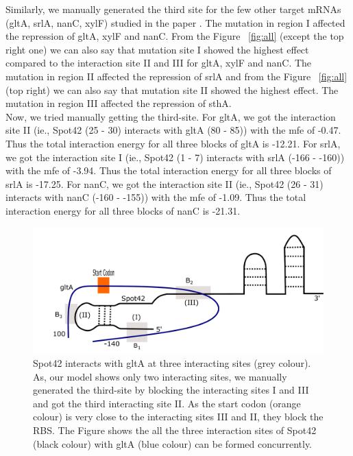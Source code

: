 \documentclass[twoside,a4paper]{report}
\numberwithin{equation}{section}
\begin{document}
Similarly, we manually generated the third site for the few other target mRNAs (gltA, srlA, nanC, xylF) studied in the paper \citep{beisel2011base}. The mutation in region I affected the repression of gltA, xylF and nanC. From the Figure ~\ref{fig:all} (except the top right one) we can also say that mutation site I showed the highest effect compared to the interaction site II and III for gltA, xylF and nanC. The mutation in region II affected the repression of srlA and from the Figure ~\ref{fig:all} (top right) we can also say that mutation site II showed the highest effect. The mutation in region III affected the repression of sthA. \\

 Now, we tried manually getting the third-site. For gltA, we got the interaction site II (ie., Spot42 (25 - 30) interacts with gltA (80 - 85)) with the mfe of -0.47. Thus the total interaction energy for all three blocks of gltA is -12.21.  For srlA, we got the interaction site I (ie., Spot42 (1 - 7) interacts with srlA (-166 - -160)) with the mfe of -3.94. Thus the total interaction energy for all three blocks of srlA is -17.25. For nanC, we got the interaction site II (ie., Spot42 (26 - 31) interacts with nanC (-160 - -155)) with the mfe of -1.09. Thus the total interaction energy for all three blocks of nanC is -21.31.\\
 
 \begin{figure}[h!]
 	\includegraphics[width=0.85\linewidth]{gltathirdsite.pdf}
 	\centering
 	\caption{ Spot42 interacts with gltA at three interacting sites (grey colour). As, our model shows only two interacting sites, we manually generated the third-site by blocking the interacting sites I and III and got the third interacting site II. As the start codon (orange colour) is very close to the interacting sites III and II, they block the RBS. The Figure shows the all the three interaction sites of Spot42 (black colour) with gltA (blue colour) can be formed concurrently.  } 
 	\label{fig:gltathirdsite}
 \end{figure}
\end{document}
